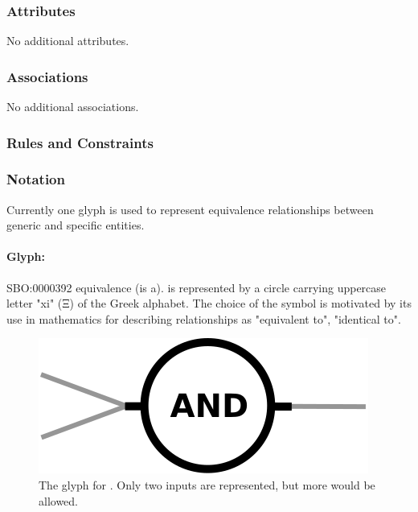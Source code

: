 \subsubsection{Attributes}

No additional attributes.

\subsubsection{Associations}

No additional associations.

\subsubsection{Rules and Constraints}

\begin{valrules}
\end{valrules}

\subsubsection{Notation}

Currently one glyph is used to represent equivalence relationships between generic and specific entities.

\paragraph{Glyph: }\label{sec:techref:equivalence}

\begin{glyphDescription}
 \glyphSboTerm SBO:0000392 equivalence (is a).
 \glyphNode {} is represented by a circle carrying uppercase letter "xi" (Ξ) of the Greek alphabet. The choice of the symbol is motivated by its use in mathematics for describing relationships as "equivalent to", "identical to". 
\end{glyphDescription}

\begin{figure}[htb]
  \centering
  \includegraphics[scale = 0.5]{images/and}
  \caption{The \PD glyph for . Only two inputs are represented, but more would be allowed.}
  \label{fig:techref:and}
\end{figure}

